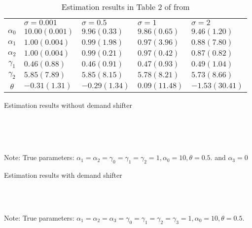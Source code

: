 \documentclass[11pt, a4paper]{article}
\begin{document}
\begin{table}[!htbp]
    \centering
    \caption{Estimation results in Table 2 of from \cite{perloff2012collinearity}}
    \label{tb:linear_linear_sigma_Perloff_Shen} 
        \begin{tabular}{cllll}
            \hline\hline
            & $\sigma=0.001$ & $\sigma=0.5$ & $\sigma=1$ & $\sigma=2$ \\
            $\alpha_0$ & $10.00(0.001)$ & $9.96(0.33)$ & $9.86(0.65)$ & $9.46(1.20)$ \\
            $\alpha_1$ & $1.00(0.004)$ & $0.99(1.98)$ & $0.97(3.96)$ & $0.88(7.80)$ \\
            $\alpha_2$ & $1.00(0.004)$ & $0.99(0.21)$ & $0.97(0.42)$ & $0.87(0.82)$ \\
            $\gamma_1$ & $0.46(0.88)$ & $0.46(0.91)$ & $0.47(0.93)$ & $0.49(1.04)$ \\
            $\gamma_2$ & $5.85(7.89)$ & $5.85(8.15)$ & $5.78(8.21)$ & $5.73(8.66)$ \\
            $\theta$ & $-0.31(1.31)$ & $-0.29(1.34)$ & $0.09(11.48)$ & $-1.53(30.41)$ \\
            \hline
        \end{tabular}
\end{table}


\begin{table}[!htbp]
  \begin{center}
      \caption{Estimation results without demand shifter}
      \label{tb:linear_linear_sigma_1_without_demand_shifter_y} 
      \subfloat[$\sigma=0.001$]{}\\
      \subfloat[$\sigma=0.5$]{}\\
      \subfloat[$\sigma=1.0$]{}\\
    \subfloat[$\sigma=2.0$]{}
  \end{center}\footnotesize
  Note: True parameters: $\alpha_1 = \alpha_2 =  \gamma_0 = \gamma_1 = \gamma_2  =  1, \alpha_0 = 10, \theta = 0.5.$ and $\alpha_3 =0$
\end{table} 


\begin{table}[!htbp]
  \begin{center}
      \caption{Estimation results with demand shifter}
      \label{tb:linear_linear_sigma_1} 
      \subfloat[$\sigma=0.001$]{}\\
      \subfloat[$\sigma=0.5$]{}\\
    \subfloat[$\sigma=2.0$]{}
  \end{center}\footnotesize
  Note: True parameters: $\alpha_1 = \alpha_2 = \alpha_3 = \gamma_0 = \gamma_1 = \gamma_2  = \gamma_3 = 1, \alpha_0 = 10, \theta = 0.5.$
\end{table} 





\end{document}

